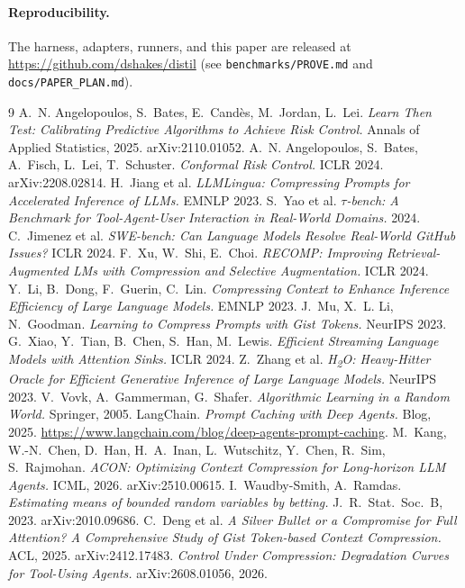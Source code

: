 \documentclass[11pt]{article}
\begin{document}
\paragraph{Reproducibility.} The harness, adapters, runners, and this paper are
released at \url{https://github.com/dshakes/distil} (see \texttt{benchmarks/PROVE.md}
and \texttt{docs/PAPER\_PLAN.md}).

\begin{thebibliography}{9}
 A.~N. Angelopoulos, S.~Bates, E.~Cand\`es, M.~Jordan, L.~Lei.
\emph{Learn Then Test: Calibrating Predictive Algorithms to Achieve Risk Control.}
Annals of Applied Statistics, 2025. arXiv:2110.01052.
 A.~N. Angelopoulos, S.~Bates, A.~Fisch, L.~Lei, T.~Schuster.
\emph{Conformal Risk Control.} ICLR 2024. arXiv:2208.02814.
 H.~Jiang et al. \emph{LLMLingua: Compressing Prompts for
Accelerated Inference of LLMs.} EMNLP 2023.
 S.~Yao et al. \emph{$\tau$-bench: A Benchmark for Tool-Agent-User
Interaction in Real-World Domains.} 2024.
 C.~Jimenez et al. \emph{SWE-bench: Can Language Models Resolve
Real-World GitHub Issues?} ICLR 2024.
 F.~Xu, W.~Shi, E.~Choi. \emph{RECOMP: Improving
Retrieval-Augmented LMs with Compression and Selective Augmentation.} ICLR 2024.
 Y.~Li, B.~Dong, F.~Guerin, C.~Lin. \emph{Compressing Context
to Enhance Inference Efficiency of Large Language Models.} EMNLP 2023.
 J.~Mu, X.~L. Li, N.~Goodman. \emph{Learning to Compress Prompts with
Gist Tokens.} NeurIPS 2023.
 G.~Xiao, Y.~Tian, B.~Chen, S.~Han, M.~Lewis. \emph{Efficient
Streaming Language Models with Attention Sinks.} ICLR 2024.
 Z.~Zhang et al. \emph{H\textsubscript{2}O: Heavy-Hitter Oracle for
Efficient Generative Inference of Large Language Models.} NeurIPS 2023.
 V.~Vovk, A.~Gammerman, G.~Shafer. \emph{Algorithmic Learning in a Random
World.} Springer, 2005.
 LangChain. \emph{Prompt Caching with Deep Agents.} Blog, 2025.
\url{https://www.langchain.com/blog/deep-agents-prompt-caching}.
 M.~Kang, W.-N.~Chen, D.~Han, H.~A.~Inan, L.~Wutschitz, Y.~Chen, R.~Sim,
S.~Rajmohan. \emph{ACON: Optimizing Context Compression for Long-horizon LLM Agents.}
ICML, 2026. arXiv:2510.00615.
 I.~Waudby-Smith, A.~Ramdas. \emph{Estimating means of bounded random variables
by betting.} J.~R.~Stat.~Soc.~B, 2023. arXiv:2010.09686.
 C.~Deng et al. \emph{A Silver Bullet or a Compromise for Full
Attention? A Comprehensive Study of Gist Token-based Context Compression.} ACL, 2025.
arXiv:2412.17483.
 \emph{Control Under Compression: Degradation Curves for
Tool-Using Agents.} arXiv:2608.01056, 2026.


\end{thebibliography}
\end{document}
